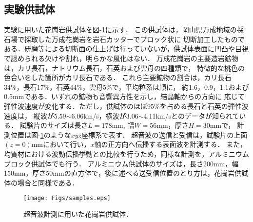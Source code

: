 ﻿%
\subsection{実験供試体}
実験に用いた花崗岩供試体を図-\ref{fig:fig1}に示す．
この供試体は，岡山県万成地域の採石場で採取した万成花崗岩を岩石カッターでブロック状に
切断加工したものである．研磨等による切断面の仕上げは行っていないが，供試体表面に凹凸や目視で認められる欠けや割れ，明らかな風化はない．
万成花崗岩の主要造岩鉱物は，カリ長石，ナトリウム長石，石英および雲母の四種類で，
特徴的な桃色の色合いをした箇所がカリ長石である．
これら主要鉱物の割合は，カリ長石34\%，長石17\%，石英44\%，雲母5\%で，平均粒系は順に，
約1.6，0.9，1.1および0.5mmである．いずれの鉱物も音響異方性を示し，結晶軸からの方向に
応じて弾性波速度が変化する．ただし，供試体のほぼ95\%を占める長石と石英の弾性波速度は，
縦波が5.59$\sim$6.06km/s，横波が3.06$\sim$4.11km/sとのデータが知られている\cite{RockPhys}．
試験片のサイズは長さ$L=178$mm, 幅$W=56$mm，厚さ$H=30$mmで，
計測位置は図-\ref{fig:fig1}のような$xyz$座標系で表す．
超音波の送信と受信は，試験片の上面$(z=0)$mmにおいて行い，$x$軸の正方向へ伝播する表面波を計測する．
また，均質材における波動伝播挙動との比較を行うため，同様な計測を，アルミニウムブロック供試体でも行う．
アルミニウム供試体のサイズは，長さ200mm，幅150mm，厚さ50mmの直方体で，後に述べる送受信位置のとり方は，花崗岩供試体の場合と同様である．
\begin{figure}
\begin{center}
\texttt{[image: Figs/samples.eps]}
\caption{
	超音波計測に用いた花崗岩供試体．
}
\label{fig:fig1}
\end{center}
	\vspace{-5mm}
\end{figure}
